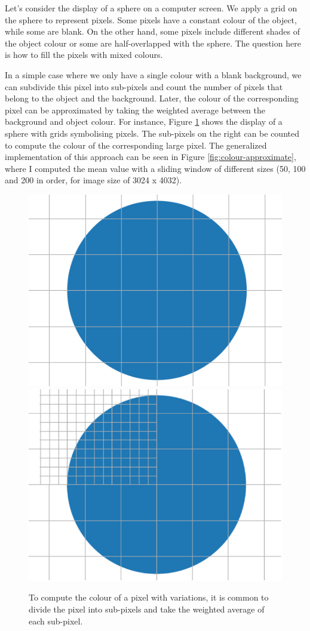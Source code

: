 Let's consider the display of a sphere on a computer screen. We apply a grid on the sphere to represent pixels. Some pixels have a constant colour of the object, while some are blank. On the other hand, some pixels include different shades of the object colour or some are half-overlapped with the sphere. The question here is how to fill the pixels with mixed colours. 


In a simple case where we only have a single colour with a blank background, we can subdivide this pixel into sub-pixels and count the number of pixels that belong to the object and the background. Later, the colour of the corresponding pixel can be approximated by taking the weighted average between the background and object colour. For instance, Figure \ref{fig:display-grid} shows the display of a sphere with grids symbolising pixels. The sub-pixels on the right can be counted to compute the colour of the corresponding large pixel. The generalized implementation of this approach can be seen in Figure \ref{fig:colour-approximate}, where I computed the mean value with a sliding window of different sizes (50, 100 and 200 in order, for image size of 3024 x 4032).

\begin{figure}
  \centering
   \includegraphics[width=0.4\linewidth]{Images/grid_circle.png}
    \includegraphics[width=0.4\linewidth]{Images/merged_grid_circle2-crop.pdf}

   \caption{To compute the colour of a pixel with variations, it is common to divide the pixel into sub-pixels and take the weighted average of each sub-pixel.}
   \label{fig:display-grid}
\end{figure}


